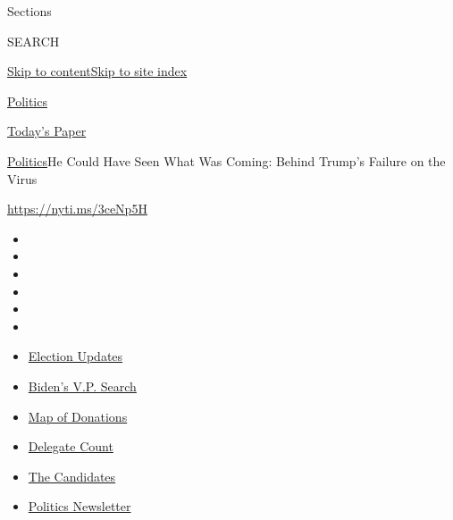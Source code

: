 Sections

SEARCH

\protect\hyperlink{site-content}{Skip to
content}\protect\hyperlink{site-index}{Skip to site index}

\href{https://www.nytimes.com/section/politics}{Politics}

\href{https://myaccount.nytimes.com/auth/login?response_type=cookie\&client_id=vi}{}

\href{https://www.nytimes.com/section/todayspaper}{Today's Paper}

\href{/section/politics}{Politics}\textbar{}He Could Have Seen What Was
Coming: Behind Trump's Failure on the Virus

\url{https://nyti.ms/3ceNp5H}

\begin{itemize}
\item
\item
\item
\item
\item
\item
\end{itemize}

\begin{itemize}
\item
  \href{https://www.nytimes.com/2020/07/31/us/elections/biden-vs-trump.html?action=click\&pgtype=Article\&state=default\&region=TOP_BANNER\&context=storylines_menu}{Election
  Updates}
\item
  \href{https://www.nytimes.com/article/biden-vice-president-2020.html?action=click\&pgtype=Article\&state=default\&region=TOP_BANNER\&context=storylines_menu}{Biden's
  V.P. Search}
\item
  \href{https://www.nytimes.com/interactive/2020/07/24/us/politics/trump-biden-campaign-donors.html?action=click\&pgtype=Article\&state=default\&region=TOP_BANNER\&context=storylines_menu}{Map
  of Donations}
\item
  \href{https://www.nytimes.com/interactive/2020/us/elections/delegate-count-primary-results.html?action=click\&pgtype=Article\&state=default\&region=TOP_BANNER\&context=storylines_menu}{Delegate
  Count}
\item
  \href{https://www.nytimes.com/interactive/2019/us/politics/2020-presidential-candidates.html?action=click\&pgtype=Article\&state=default\&region=TOP_BANNER\&context=storylines_menu}{The
  Candidates}
\item
  \href{https://www.nytimes.com/newsletters/politics?action=click\&pgtype=Article\&state=default\&region=TOP_BANNER\&context=storylines_menu}{Politics
  Newsletter}
\end{itemize}


